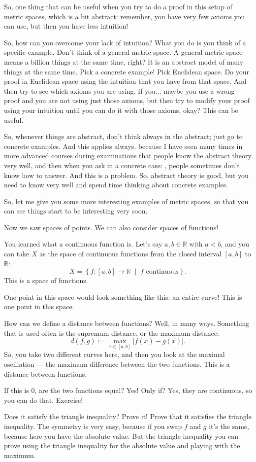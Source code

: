 \begin{spoken-clean}[01:19:28 - 01:24:54]
So, one thing that can be useful when you try to do a proof in this setup of metric spaces, which is a bit abstract: remember, you have very few axioms you can use, but then you have less intuition!

So, how can you overcome your lack of intuition? What you do is you think of a specific example. Don't think of a general metric space. A general metric space means a billion things at the same time, right? It is an abstract model of many things at the same time. Pick a concrete example! Pick Euclidean space. Do your proof in Euclidean space using the intuition that you have from that space. And then try to see which axioms you are using. If you... maybe you use a wrong proof and you are not using just those axioms, but then try to modify your proof using your intuition until you can do it with those axioms, okay? This can be useful.

So, whenever things are abstract, don't think always in the abstract; just go to concrete examples. And this applies always, because I have seen many times in more advanced courses during examinations that people know the abstract theory very well, and then when you ask in a concrete case: , people sometimes don't know how to answer. And this is a problem. So, abstract theory is good, but you need to know very well and spend time thinking about concrete examples.

So, let me give you some more interesting examples of metric spaces, so that you can see things start to be interesting very soon.

Now we saw spaces of points. We can also consider spaces of functions!

You learned what a continuous function is. Let's say $a, b \in \mathbb{R}$ with $a < b$, and you can take $X$ as the space of continuous functions from the closed interval $[a, b]$ to $\mathbb{R}$:
\[
X = \left\{ f \colon [a, b] \to \mathbb{R} \;\middle|\; f \text{ continuous} \right\}.
\]
This is a space of functions.

One point in this space would look something like this: an entire curve! This is one point in this space.

How can we define a distance between functions? Well, in many ways. Something that is used often is the supremum distance, or the maximum distance:
\[
d(f, g) := \max_{x \in [a, b]} |f(x) - g(x)|.
\]
So, you take two different curves here, and then you look at the maximal oscillation --- the maximum difference between the two functions. This is a distance between functions.

If this is $0$, are the two functions equal? Yes! Only if? Yes, they are continuous, so you can do that. Exercise!

Does it satisfy the triangle inequality? Prove it! Prove that it satisfies the triangle inequality. The symmetry is very easy, because if you swap $f$ and $g$ it's the same, because here you have the absolute value. But the triangle inequality you can prove using the triangle inequality for the absolute value and playing with the maximum.
\end{spoken-clean}


